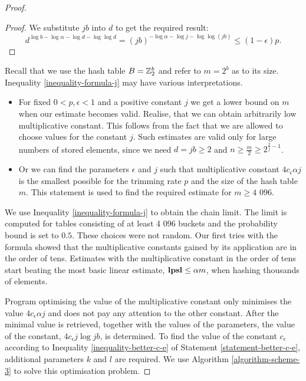 \begin{proof}
\begin{proof}
We substitute $j b$ into $d$ to get the required result:
\[
	d ^ {\log b - \log \alpha - \log d - \log \log d} = \left(j b\right)^{-\log \alpha -\log j - \log \log (j b)} \leq (1 - \epsilon)p \text{.}
\]
\end{proof}

Recall that we use the hash table $B = \mathbb{Z}_{2}^{b}$ and refer to $m = 2 ^ b$ as to its size. Inequality \ref{inequality-formula-j} may have various interpretations.
\begin{itemize}
\item For fixed $0 < p, \epsilon < 1$ and a positive constant $j$ we get a lower bound on $m$ when our estimate becomes valid. Realise, that we can obtain arbitrarily low multiplicative constant. This follows from the fact that we are allowed to choose values for the constant $j$. Such estimates are valid only for large numbers of stored elements, since we need $d = jb \geq 2$ and $n \geq \frac{m}{2} \geq 2 ^ {\frac{2}{j} - 1}$.
\item Or we can find the parameters $\epsilon$ and $j$ such that multiplicative constant $4 c_\epsilon \alpha j$ is the smallest possible for the trimming rate $p$ and the size of the hash table $m$. This statement is used to find the required estimate for $m \geq \text{4 096}$.
\end{itemize}

We use Inequality \ref{inequality-formula-j} to obtain the chain limit. The limit is computed for tables consisting of at least 4 096 buckets and the probability bound is set to $0.5$. These choices were not random. Our first tries with the formula showed that the multiplicative constants gained by its application are in the order of tens. Estimates with the multiplicative constant in the order of tens start beating the most basic linear estimate, $\mathbf{lpsl} \leq \alpha m$, when hashing thousands of elements.

Program optimising the value of the multiplicative constant only minimises the value $4 c_\epsilon \alpha j$ and does not pay any attention to the other constant. After the minimal value is retrieved, together with the values of the parameters, the value of the constant, $4 c_\epsilon j \log j b$, is determined. To find the value of the constant $c_\epsilon$ according to Inequality \ref{inequality-better-c-e} of Statement \ref{statement-better-c-e}, additional parameters $k$ and $l$ are required. We use Algorithm \ref{algorithm-scheme-3} to solve this optimisation problem.


\end{proof}
